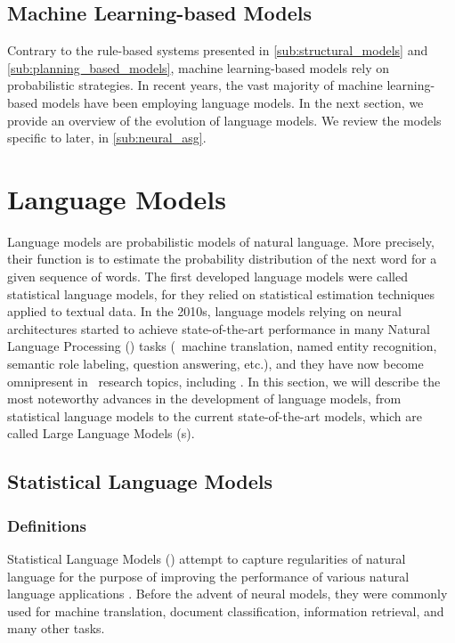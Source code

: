 \subsection{Machine Learning-based Models}

Contrary to the rule-based {\asg} systems presented in \autoref{sub:structural_models} and \autoref{sub:planning_based_models}, machine learning-based models rely on probabilistic strategies. In recent years, the vast majority of machine learning-based models have been employing language models. In the next section, we provide an overview of the evolution of language models. We review the models specific to {\asg} later, in \autoref{sub:neural_asg}.

\section{Language Models}
\label{sec:language_models}

Language models are probabilistic models of natural language. More precisely, their function is to estimate the probability distribution of the next word for a given sequence of words. The first developed language models were called statistical language models, for they relied on statistical estimation techniques applied to textual data. In the 2010s, language models relying on neural architectures started to achieve state-of-the-art performance in many Natural Language Processing (\nlp) tasks (\eg\ machine translation, named entity recognition, semantic role labeling, question answering, etc.), and they have now become omnipresent in \nlp\ research topics, including \asg. In this section, we will describe the most noteworthy advances in the development of language models, from statistical language models to the current state-of-the-art models, which are called Large Language Models ({\llm}s).

\subsection{Statistical Language Models}

\subsubsection{Definitions}
Statistical Language Models (\slm) attempt to capture regularities of natural language for the purpose of improving the performance of various natural language applications \citep{rosenfeld2000two}. Before the advent of neural models, they were commonly used for machine translation, document classification, information retrieval, and many other tasks.

